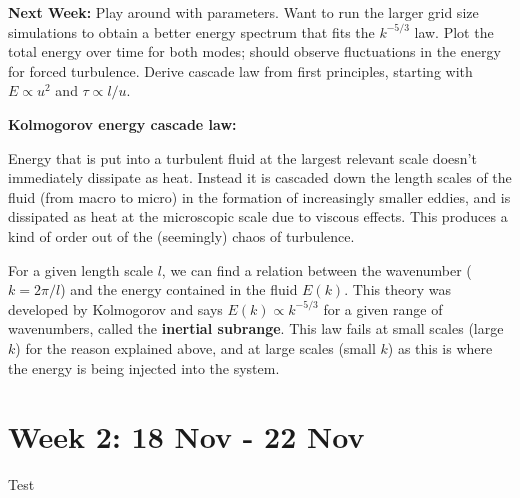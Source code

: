 \documentclass[12pt,letterpaper]{article}
\begin{document}
\textbf{Next Week:} Play around with parameters. Want to run the larger grid size simulations to obtain a better energy spectrum that fits the $k^{-5/3}$ law. Plot the total energy over time for both modes; should observe fluctuations in the energy for forced turbulence. Derive cascade law from first principles, starting with $E\propto u^2$ and $\tau \propto l/u$.

\hypertarget{Kolmogorov}{\textbf{Kolmogorov energy cascade law:}} Energy that is put into a turbulent fluid at the largest relevant scale doesn't immediately dissipate as heat. Instead it is cascaded down the length scales of the fluid (from macro to micro) in the formation of increasingly smaller eddies, and is dissipated as heat at the microscopic scale due to viscous effects. This produces a kind of order out of the (seemingly) chaos of turbulence.

For a given length scale $l$, we can find a relation between the wavenumber ($k=2\pi/l$) and the energy contained in the fluid $E(k)$. This theory was developed by Kolmogorov and says $E(k)\propto k^{-5/3}$ for a given range of wavenumbers, called the \textbf{inertial subrange}. This law fails at small scales (large $k$) for the reason explained above, and at large scales (small $k$) as this is where the energy is being injected into the system.


\section*{Week 2: 18 Nov - 22 Nov}
Test
\end{document}
